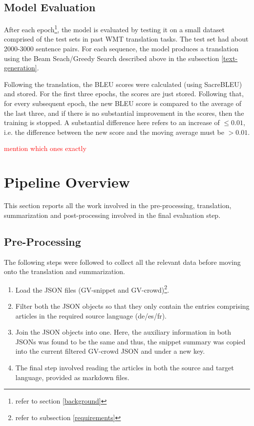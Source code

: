 \documentclass[12pt,a4paper,twoside,openright]{report}
\newcommand{\red}[1]{\textcolor{red}{#1}}
\begin{document}
\subsection{Model Evaluation}
\label{model-evaluation}
After each epoch\footnote{refer to section \ref{background}}, the model is evaluated by testing it on a small dataset comprised of the test sets in past WMT translation tasks. The test set had about 2000-3000 sentence pairs. For each sequence, the model produces a translation using the Beam Seach/Greedy Search described above in the subsection \ref{text-generation}. 

Following the translation, the BLEU scores were calculated (using SacreBLEU) and stored. For the first three epochs, the scores are just stored. Following that, for every subsequent epoch, the new BLEU score is compared to the average of the last three, and if there is no substantial improvement in the scores, then the training is stopped. A substantial difference here refers to an increase of $\leq 0.01$, i.e. the difference between the new score and the moving average must be $> 0.01$. 

\red{mention which ones exactly}

\section{Pipeline Overview}
\label{pipeline-overview}
This section reports all the work involved in the pre-processing, translation, summarization and post-processing involved in the final evaluation step. 

\subsection{Pre-Processing}
\label{preprocessing}
The following steps were followed to collect all the relevant data before moving onto the translation and summarization. 
\begin{enumerate}
    \item Load the JSON files (GV-snippet and GV-crowd)\footnote{refer to subsection \ref{requirements}}.
    \item Filter both the JSON objects so that they only contain the entries comprising articles in the required source language (de/es/fr). 
    \item Join the JSON objects into one. Here, the auxiliary information in both JSONs was found to be the same and thus, the snippet summary was copied into the current filtered GV-crowd JSON and under a new key. 
    \item The final step involved reading the articles in both the source and target language, provided as markdown files.
\end{enumerate}
\end{document}
